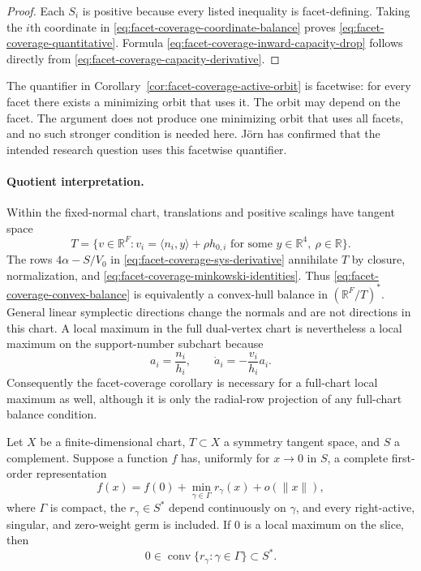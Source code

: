 \begin{unverified}
\begin{proof}
Each $S_i$ is positive because every listed inequality is facet-defining.
Taking the $i$th coordinate in
\eqref{eq:facet-coverage-coordinate-balance} proves
\eqref{eq:facet-coverage-quantitative}.  Formula
\eqref{eq:facet-coverage-inward-capacity-drop} follows directly from
\eqref{eq:facet-coverage-capacity-derivative}.
\end{proof}

The quantifier in Corollary~\ref{cor:facet-coverage-active-orbit} is
facetwise: for every facet there exists a minimizing orbit that uses it.  The
orbit may depend on the facet.  The argument does not produce one minimizing
orbit that uses all facets, and no such stronger condition is needed here.
Jörn has confirmed that the intended research question uses this facetwise
quantifier.

\paragraph{Quotient interpretation.}
Within the fixed-normal chart, translations and positive scalings have tangent
space
\[
  T=\{v\in\mathbb R^F:v_i=\langle n_i,y\rangle+\rho h_{0,i}
      \text{ for some }y\in\mathbb R^4,\ \rho\in\mathbb R\}.
\]
The rows $4\alpha-S/V_0$ in
\eqref{eq:facet-coverage-sys-derivative} annihilate $T$ by closure,
normalization, and \eqref{eq:facet-coverage-minkowski-identities}.  Thus
\eqref{eq:facet-coverage-convex-balance} is equivalently a convex-hull balance
in $(\mathbb R^F/T)^*$.  General linear symplectic directions change the
normals and are not directions in this chart.  A local maximum in the full
dual-vertex chart is nevertheless a local maximum on the support-number
subchart because
\begin{equation}\label{eq:facet-coverage-support-to-row}
  a_i=\frac{n_i}{h_i},
  \qquad
  \dot a_i=-\frac{v_i}{h_i}a_i.
\end{equation}
Consequently the facet-coverage corollary is necessary for a full-chart local
maximum as well, although it is only the radial-row projection of any
full-chart balance condition.

\begin{lemma}
\label{lem:facet-coverage-abstract-balance}
Let $X$ be a finite-dimensional chart, $T\subset X$ a symmetry tangent space,
and $S$ a complement.  Suppose a function $f$ has, uniformly for $x\to0$ in
$S$, a complete first-order representation
\[
  f(x)=f(0)+\min_{\gamma\in\Gamma}r_\gamma(x)+o(\|x\|),
\]
where $\Gamma$ is compact, the $r_\gamma\in S^*$ depend continuously on
$\gamma$, and every right-active, singular, and zero-weight germ is included.
If $0$ is a local maximum on the slice, then
\[
  0\in\operatorname{conv}\{r_\gamma:\gamma\in\Gamma\}\subset S^*.
\]
\end{lemma}


\end{unverified}
